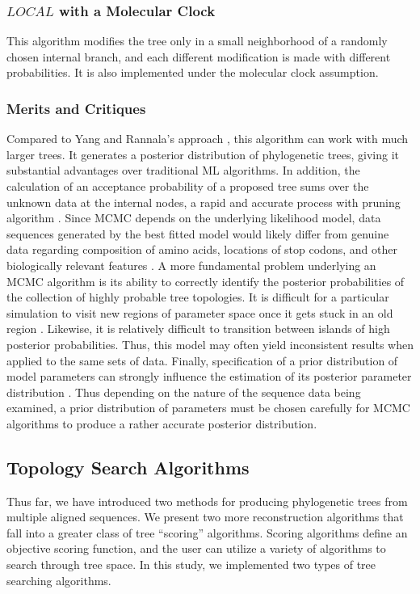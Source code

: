 \documentclass[10pt,twocolumn]{article}
\begin{document}
\subsubsection*{$LOCAL$ with a Molecular Clock}
This algorithm modifies the tree only in a small neighborhood of a randomly chosen internal branch, and each different modification is made with different probabilities. It is also implemented under the molecular clock assumption.

\subsubsection*{Merits and Critiques}
Compared to Yang and Rannala's approach \cite{yang1997bayesian}, this algorithm can work with much larger trees. It generates a posterior distribution of phylogenetic trees, giving it substantial advantages over traditional ML algorithms. In addition, the calculation of an acceptance probability of a proposed tree sums over the unknown data at the internal nodes, a rapid and accurate process with pruning algorithm \cite{felsenstein1983statistical}.
Since MCMC depends on the underlying likelihood model, data sequences generated by the best fitted model would likely differ from genuine data regarding composition of amino acids, locations of stop codons, and other biologically relevant features \cite{larget1999markov}.
A more fundamental problem underlying an MCMC algorithm is its ability to correctly identify the posterior probabilities of the collection of highly probable tree topologies. It is difficult for a particular simulation to visit new regions of parameter space once it gets stuck in an old region \cite{larget1999markov}. Likewise, it is relatively difficult to transition between islands of high posterior probabilities. Thus, this model may often yield inconsistent results when applied to the same sets of data.
Finally, specification of a prior distribution of model parameters can strongly influence the estimation of its posterior parameter distribution \cite{qian2003monte}. Thus depending on the nature of the sequence data being examined, a prior distribution of parameters must be chosen carefully for MCMC algorithms to produce a rather accurate posterior distribution.

\subsection*{Topology Search Algorithms}
Thus far, we have introduced two methods for producing phylogenetic trees from multiple
aligned sequences. We present two more reconstruction algorithms that fall into a greater class of tree
``scoring'' algorithms. Scoring algorithms define an objective scoring function, and the user
can utilize a variety of algorithms to search through tree space.
In this study, we implemented two types
of tree searching algorithms.
\end{document}
